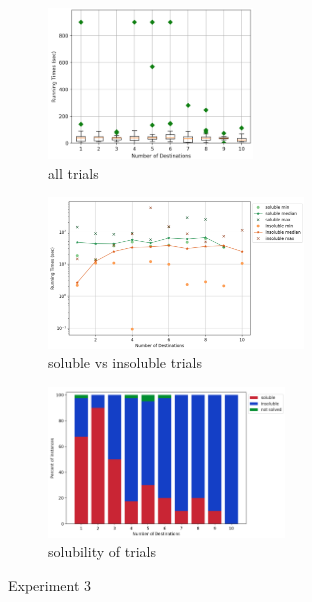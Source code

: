 \documentclass{mpaper}
\begin{document}
\begin{figure}[!ht]
    \centering
    \begin{subfigure}[b]{0.30\textwidth}
        \includegraphics[width=\textwidth, height=4cm]{images/experiments/varyd/varyD.png}
        \caption{all trials}
        \label{fig:exp3all}
    \end{subfigure}
    \begin{subfigure}[b]{0.36\textwidth}
        \includegraphics[width=\textwidth, height=4cm]{images/experiments/varyd/satunsat_d.png}
        \caption{soluble vs insoluble trials}
        \label{fig:exp3sat}
    \end{subfigure}
    \begin{subfigure}[b]{0.32\textwidth}
        \includegraphics[width=\textwidth, height=4cm]{images/experiments/varyd/varyDsat.png}
        \caption{solubility of trials}
        \label{fig:varydsat}
    \end{subfigure}
    \caption{Experiment 3}
    \label{experiment3}
\end{figure}
\vspace{-1mm}
\end{document}
